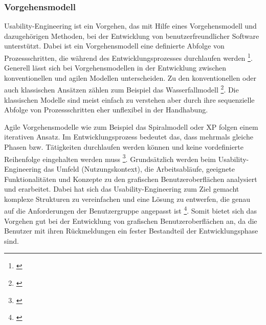 \subsubsection{Vorgehensmodell}
Usability-Engineering ist ein Vorgehen, das mit Hilfe eines Vorgehensmodell und dazugehörigen Methoden, bei der Entwicklung von benutzerfreundlicher Software unterstützt. Dabei ist ein Vorgehensmodell eine definierte Abfolge von Prozessschritten, die während des Entwicklungsprozesses durchlaufen werden \footnote{\cite[vgl.][7]{Richter2013}}. Generell lässt sich bei Vorgehensmodellen in der Entwicklung zwischen konventionellen und agilen Modellen unterscheiden. Zu den konventionellen oder auch klassischen Ansätzen zählen zum Beispiel das Wasserfallmodell \footnote{\cite[vgl.][27\psqq]{Brandt2008}}. Die klassischen Modelle sind meist einfach zu verstehen aber durch ihre sequenzielle Abfolge von Prozessschritten eher unflexibel in der Handhabung.

Agile Vorgehensmodelle wie zum Beispiel das Spiralmodell oder \gls{XP} folgen einem iterativen Ansatz. Im Entwicklungsprozess bedeutet das, dass mehrmals gleiche Phasen bzw. Tätigkeiten durchlaufen werden können und keine vordefinierte Reihenfolge eingehalten werden muss \footnote{\cite[vgl.][29\psqq]{Brandt2008}}. Grundsätzlich werden beim Usability-Engineering das Umfeld (Nutzungskontext), die Arbeitsabläufe, geeignete Funktionalitäten und Konzepte zu den grafischen Benutzeroberflächen analysiert und erarbeitet. Dabei hat sich das Usability-Engineering zum Ziel gemacht komplexe Strukturen zu vereinfachen und eine Lösung zu entwerfen, die genau auf die Anforderungen der Benutzergruppe angepasst ist \footnote{\cite[vgl.][7]{Richter2013}}. Somit bietet sich das Vorgehen gut bei der Entwicklung von grafischen Benutzeroberflächen an, da die Benutzer mit ihren Rückmeldungen ein fester Bestandteil der Entwicklungsphase sind.

